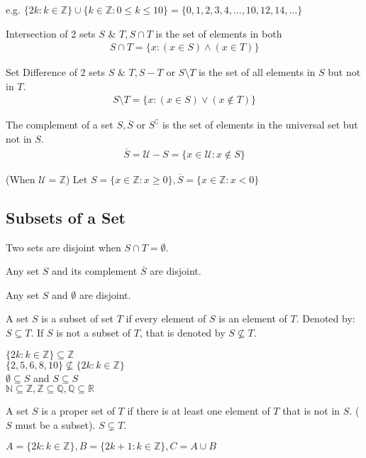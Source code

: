 \documentclass{article}
\begin{document}
e.g. $\{2k: k \in \mathbb{Z}\} \cup \{k \in \mathbb{Z}: 0 \le k \le 10\} = \{0,1,2,3,4,\ldots,10,12,14,\ldots\}$

Intersection of 2 sets $S$ \& $T, S \cap T$ is the set of elements in both
\begin{align*}
    S \cap T = \{x: (x \in S) \wedge (x \in T)\}
\end{align*}

Set Difference of 2 sets $S$ \& $T, S - T$ or $S \setminus T$ is the set of all elements in $S$ but not in $T$. 
\begin{align*}
    S \setminus T = \{x: (x \in S) \vee (x \notin T)\}
\end{align*}

The complement of a set $S, \overline{S}$ or $S^\complement$ is the set of elements in the universal set but not in $S$. 
\begin{align*}
    \overline{S} = \mathcal{U} - S = \{x \in \mathcal{U}: x \notin S\}
\end{align*}

(When $\mathcal{U} = \mathbb{Z}$) Let $S = \{x \in \mathbb{Z}: x \ge 0\}, \overline{S} = \{x \in \mathbb{Z}: x < 0\}$


\subsection{Subsets of a Set}

Two sets are disjoint when $S \cap T = \emptyset$.

Any set $S$ and its complement $\overline{S}$ are disjoint. 

Any set $S$ and $\emptyset$ are disjoint.

A set $S$ is a subset of set $T$ if every element of $S$ is an element of $T$. Denoted by: $S \subseteq T$. If $S$ is not a subset of $T$, that is denoted by $S \nsubseteq T$.

$\{2k: k \in \mathbb{Z}\} \subseteq \mathbb{Z}$\\
$\{2,5,6,8,10\} \nsubseteq \{2k: k \in \mathbb{Z}\}$\\
$\emptyset \subseteq S$ and $S \subseteq S$\\
$\mathbb{N} \subseteq \mathbb{Z}, \mathbb{Z} \subseteq \mathbb{Q}, \mathbb{Q} \subseteq \mathbb{R}$

A set $S$ is a proper set of $T$ if there is at least one element of $T$ that is not in $S$. ($S$ must be a subset). $S \subsetneq T$.

$A = \{2k: k \in \mathbb{Z}\}, B = \{2k+1: k \in \mathbb{Z}\}, C = A \cup B$
\end{document}
